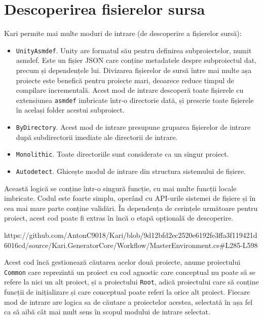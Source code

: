 \documentclass{report}
\begin{document}
\section{Descoperirea fisierelor sursa}

Kari permite mai multe moduri de intrare (de descoperire a fișierelor sursă):

\begin{itemize}
  \item \texttt{UnityAsmdef}.
    Unity are formatul său pentru definirea subproiectelor, numit asmdef.
    Este un fișier JSON care conține metadatele despre subproiectul dat, precum și dependențele lui.
    Divizarea fișierelor de sursă între mai multe așa proiecte este benefică pentru proiecte mari, deoarece reduce timpul de compilare incrementală.
    Acest mod de intrare descoperă toate fișierele cu extensiunea \texttt{asmdef} imbricate într-o directorie dată, și prescrie toate fișierele în același folder acestui subproiect.

  \item \texttt{ByDirectory}. Acest mod de intrare presupune gruparea fișierelor de intrare după subdirectorii imediate ale directorii de intrare.

  \item \texttt{Monolithic}. Toate directoriile sunt considerate ca un singur proiect.

  \item \texttt{Autodetect}. Ghicește modul de intrare din structura sistemului de fișiere.
\end{itemize}

Această logică se conține într-o singură funcție, cu mai multe funcții locale imbricate.
Codul este foarte simplu, operând cu API-urile sistemei de fișiere și în cea mai mare parte conține validări.
În dependența de cerințele următoare pentru proiect, acest cod poate fi extras în încă o etapă opțională de descoperire.

https://github.com/AntonC9018/Kari/blob/9d12bfd2ec2520e6192fe3ffa3f119421d6016cd/source/Kari.GeneratorCore/Workflow/MasterEnvironment.cs#L285-L598

Acest cod încă gestionează căutarea acelor două proiecte, anume proiectului \texttt{Common} care reprezintă un proiect cu cod agnostic care conceptual nu poate să se refere la nici un alt proiect, și a proiectului \texttt{Root}, adică proiectului care să conține funcții de inițializare și care conceptual poate referi la orice alt proiect.
Fiecare mod de intrare are logica sa de căutare a proiectelor acestea, selectată în așa fel ca să aibă cât mai mult sens în scopul modului de intrare selectat.
\end{document}
